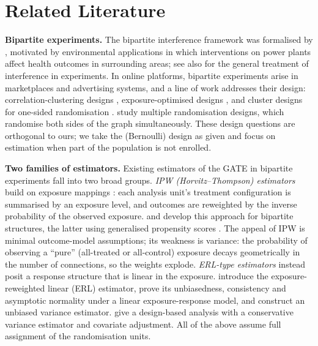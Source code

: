 \documentclass[sigconf,nonacm]{acmart}
\newcounter{assumption}
\begin{document}
\section{Related Literature}\label{sec:literature}

\textbf{Bipartite experiments.} The bipartite interference framework was formalised by \citet{zigler2021bipartite}, motivated by environmental applications in which interventions on power plants affect health outcomes in surrounding areas; see also \citet{hudgens2008toward,aronow2017estimating,eckles2017design} for the general treatment of interference in experiments. In online platforms, bipartite experiments arise in marketplaces and advertising systems, and a line of work addresses their design: correlation-clustering designs \cite{pouget2019variance}, exposure-optimised designs \cite{harshaw2023erl}, and cluster designs for one-sided randomisation \cite{brennan2022cluster}. \citet{bajari2021multiple} study multiple randomisation designs, which randomise both sides of the graph simultaneously. These design questions are orthogonal to ours; we take the (Bernoulli) design as given and focus on estimation when part of the population is not enrolled.

\textbf{Two families of estimators.} Existing estimators of the GATE in bipartite experiments fall into two broad groups. \emph{IPW (Horvitz--Thompson) estimators} build on exposure mappings \cite{aronow2017estimating}: each analysis unit's treatment configuration is summarised by an exposure level, and outcomes are reweighted by the inverse probability of the observed exposure. \citet{zigler2021bipartite} and \citet{doudchenko2020causal} develop this approach for bipartite structures, the latter using generalised propensity scores \cite{hirano2004propensity}. The appeal of IPW is minimal outcome-model assumptions; its weakness is variance: the probability of observing a ``pure'' (all-treated or all-control) exposure decays geometrically in the number of connections, so the weights explode. \emph{ERL-type estimators} instead posit a response structure that is linear in the exposure. \citet{harshaw2023erl} introduce the exposure-reweighted linear (ERL) estimator, prove its unbiasedness, consistency and asymptotic normality under a linear exposure-response model, and construct an unbiased variance estimator. 
\citet{lu2025design} give a design-based analysis with a conservative variance estimator and covariate adjustment. 
All of the above assume full assignment of the randomisation units.
\end{document}
